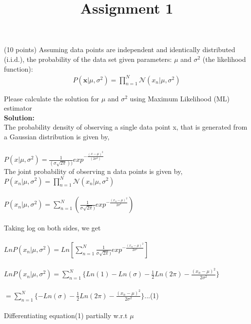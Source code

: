 \documentclass{exam}
\title{Assignment 1}
\date{}
\begin{document}
\maketitle
\thispagestyle{headandfoot}

\begin{center}
  {}
\end{center}
\vspace{.5cm}
\begin{questions}

 (10 points) Assuming data points are independent and identically distributed (i.i.d.), the probability of the data set given parameters: $\mu$ and $\sigma^2$ (the likelihood function):
\begin{align}
\nonumber P(\mathbf{x}|\mu,\sigma^2) = \prod_{n=1}^N\mathcal{N}(x_n|\mu,\sigma^2)
\end{align}

Please calculate the solution for $\mu$ and $\sigma^2$ using Maximum Likelihood (ML) estimator\\
\textbf{Solution:}\\
The probability density of observing a single data point x, that is generated from a Gaussian distribution is given by,\\\\
$P(x|\mu , \sigma^2) = \frac{1}{(\sigma \sqrt{2\pi}))} exp^{-\frac{(x- \mu)^2}{(2 \sigma^2)}}$\\

The joint probability of observing n data points is given by,\\
 
$P(x_{n}|\mu , \sigma^2) = \prod_{n=1}^{N} \mathcal{N}(x_{n} | \mu,\sigma^2)$\\\\
$P(x_{n}|\mu , \sigma^2) = \sum_{n=1}^{N} (\frac{1}{\sigma \sqrt{2\pi})} exp^{- \frac{(x_{n}- \mu)^2}{2 \sigma^2}})$\\\\

Taking log on both sides, we get\\\\
$Ln P(x_{n}|\mu , \sigma^2) = Ln[ \sum_{n=1}^{N} \frac{1}{\sigma \sqrt{2\pi})} exp^{-\frac{(x_{n}- \mu)^2}{2 \sigma^2}} ]$\\\\
$Ln P(x_{n}|\mu , \sigma^2) = \sum_{n=1}^{N} \{Ln(1) -Ln (\sigma) -\frac{1}{2} Ln(2\pi) - \frac{(x_{n}- \mu)^2}{2 \sigma^2}\} $\\\\
$ = \sum_{n=1}^{N} \{-Ln (\sigma) -\frac{1}{2} Ln(2\pi) - \frac{(x_{n}- \mu)^2}{2 \sigma^2}\} $\quad \quad ...(1)\\\\
Differentiating equation(1) partially w.r.t $\mu$\\


\end{questions}
\end{document}
